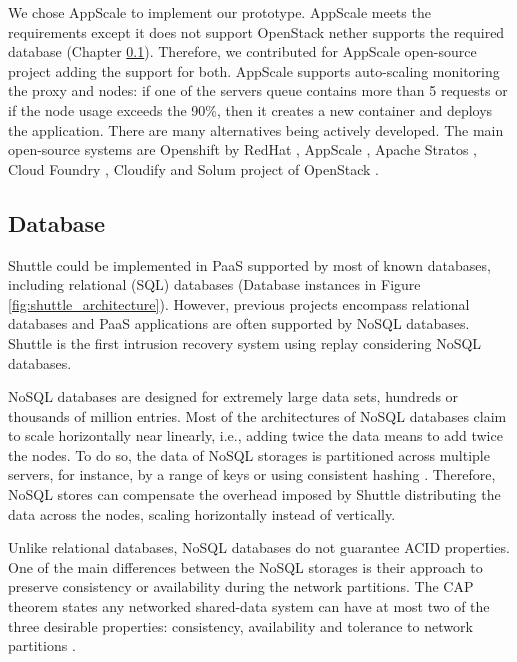 We chose AppScale \cite{Appscale} to implement our prototype. AppScale meets the requirements except it does not support OpenStack nether supports the required database (Chapter \ref{sec:impl:database_options}).  Therefore, we contributed for AppScale open-source project adding the support for both. AppScale supports auto-scaling monitoring the proxy and nodes: if one of the servers queue contains more than 5 requests or if the node usage exceeds the 90\%, then it creates a new container and deploys the application. There are many alternatives being actively developed. The main open-source systems are Openshift by RedHat \cite{OpenShift}, AppScale \cite{Appscale}, Apache Stratos \cite{ApacheStratos}, Cloud Foundry \cite{Cloudfoundry}, Cloudify \cite{cloudify} and Solum project of OpenStack \cite{solum}.  


\subsection{Database}\label{sec:impl:database_options}
Shuttle could be implemented in \ac{PaaS} supported by most of known databases, including relational (\ac{SQL}) databases (Database instances in Figure \ref{fig:shuttle_architecture}). However, previous projects encompass relational databases \cite{warp,goel} and \ac{PaaS} applications are often supported by \acs{NoSQL} databases. Shuttle is the first intrusion recovery system using replay considering \acs{NoSQL} databases.

\acs{NoSQL} databases are designed for extremely large data sets, hundreds or thousands of million entries. Most of the architectures of \acs{NoSQL} databases claim to scale horizontally near linearly, i.e., adding twice the data means to add twice the nodes. To do so, the data of \acs{NoSQL} storages is partitioned across multiple servers, for instance, by a range of keys or using consistent hashing \cite{Chang2008}. Therefore, \acs{NoSQL} stores can compensate the overhead imposed by Shuttle distributing the data across the nodes, scaling horizontally instead of vertically. 


Unlike relational databases, \acs{NoSQL} databases do not guarantee \acf{ACID} properties. One of the main differences between the \acs{NoSQL} storages is their approach to preserve consistency or availability during the network partitions. The \acs{CAP} theorem states any networked shared-data system can have at most two of the three desirable properties: consistency, availability and tolerance to network partitions \cite{brewer2012cap}.

